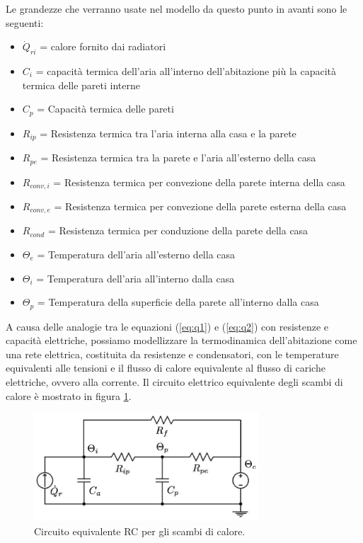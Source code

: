 \documentclass[laurea,oneside,11pt]{USiena_tesiLM}
\begin{document}
Le grandezze che verranno usate nel modello da questo punto in avanti sono le seguenti:
\begin{itemize}
\item[] $\dot{Q}_{ri}$ = calore fornito dai radiatori
\item[]$C_i$ = capacità termica dell'aria all'interno dell'abitazione più la capacità termica delle pareti interne
\item[]$C_p$ = Capacità termica delle pareti
\item[]$R_{ip}$ = Resistenza termica tra l'aria interna alla casa e la parete 
\item[]$R_{pe}$ = Resistenza termica tra la parete e l'aria all'esterno della casa
\item[]$R_{conv,i}$ = Resistenza termica per convezione della  parete interna della casa
\item[]$R_{conv,e}$ = Resistenza termica per convezione della  parete esterna della casa
\item[]$R_{cond}$ = Resistenza termica per conduzione della parete della casa
\item[]$\Theta_{e}$ = Temperatura dell'aria all'esterno della casa
\item[]$\Theta_i$ = Temperatura dell'aria all'interno dalla casa
\item[]$\Theta_p$ = Temperatura della superficie della parete all'interno dalla casa 
\end{itemize}


A causa delle analogie tra le equazioni (\ref{eq:q1}) e (\ref{eq:q2}) con resistenze e capacità elettriche, possiamo modellizzare la termodinamica dell'abitazione come una rete elettrica, costituita da resistenze e condensatori, con le temperature equivalenti alle tensioni e il flusso di calore equivalente al flusso di cariche elettriche, ovvero alla corrente. Il circuito elettrico equivalente degli scambi di calore è mostrato in figura \ref{fig:RC}.

\begin{figure}[h]
\begin{center}
\includegraphics[width=0.75\textwidth]{figure/schema_trasf_calore}
\caption{Circuito equivalente RC per gli scambi di calore.}
\label{fig:RC}
\end{center}
\end{figure}
 
\end{document}
